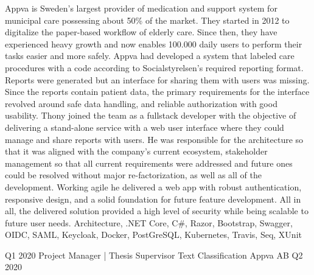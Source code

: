 \begin{experiences}
{        Appva is Sweden’s largest provider of medication and support system for municipal care possessing about 50\% of the market.
        They started in 2012 to digitalize the paper-based workflow of elderly care.
        Since then, they have experienced heavy growth and now enables 100.000 daily users to perform their tasks easier and more safely.
        \newline \newline
        Appva had developed a system that labeled care procedures with a code according to Socialstyrelsen’s required reporting format.
        Reports were generated but an interface for sharing them with users was missing.
        Since the reports contain patient data, the primary requirements for the interface revolved around safe data handling, and reliable authorization with good usability.
        \newline \newline
        Thony joined the team as a fullstack developer with the objective of delivering a stand-alone service with a web user interface where they could manage and share reports with users.
        He was responsible for the architecture so that it was aligned with the company's current ecosystem, stakeholder management so that all current requirements were addressed and future ones could be resolved without major re-factorization, as well as all of the development.
        Working agile he delivered a web app with robust authentication, responsive design, and a solid foundation for future feature development.
        All in all, the delivered solution provided a high level of security while being scalable to future user needs.
        \newline
    }
    {Architecture, .NET Core, C\#, Razor, Bootstrap, Swagger, OIDC, SAML, Keycloak, Docker, PostGreSQL, Kubernetes, Travis, Seq, XUnit}
    \emptySeparator
    
    \experience
    {Q1 2020}   
    {Project Manager | Thesis Supervisor}
    {Text Classification}
    {Appva AB}
    {Q2 2020} {
    
}
\end{experiences}
